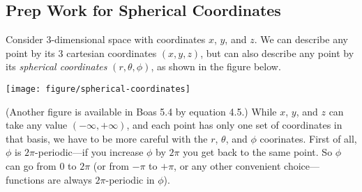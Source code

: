 \documentclass[answers]{exam}\newcommand{\repositoryInformationSetup}{     \usepackage[dvipsnames]{xcolor}     \usepackage[ angle=90, color=black, opacity=1, scale=2, ]{background}      \SetBgPosition{current page.west}      \SetBgVshift{-4.5mm}      \backgroundsetup{contents={{\color{green}\texttt{-{}-} differs from commit \texttt{aac605f} in 0 files}}} } \newcommand{\commit}{{{\color{green}aac605f}}}\usepackage{amsmath}
\newcommand{\Reals}{\mathbb{R}\xspace}
\providecommand{\id}{}
\renewcommand{\id}[1]{\ensuremath{\; \mathrm{d}#1}}
\newcommand{\ket}[1]{\ensuremath{\left|\;#1\;\right\rangle}}
\newcommand{\bracket}[2]{\ensuremath{\left\langle\;#1\;\middle|\;#2\;\right\rangle}}
\let\braket\bracket
\newcommand{\operator}[3]{\ensuremath{\left|\;#1\;\middle\rangle\; #2\; \middle\langle\;#3\;\right|}}
\begin{document}
\begin{questions}
 
	\clearpage
	\section*{Prep Work for Spherical Coordinates}
	\question Consider 3-dimensional space with coordinates $x$, $y$, and $z$.  We can describe any point by its 3 cartesian coordinates $(x, y, z)$, but can also describe any point by its \emph{spherical coordinates} $(r, \theta, \phi)$, as shown in the figure below.
\begin{center}
	\texttt{[image: figure/spherical-coordinates]}
\end{center}
(Another figure is available in Boas 5.4 by equation 4.5.)
While $x$, $y$, and $z$ can take any value $(-\infty,+\infty)$, and each point has only one set of coordinates in that basis, we have to be more careful with the $r$, $\theta$, and $\phi$ coorinates.  First of all, $\phi$ is $2\pi$-periodic---if you increase $\phi$ by $2\pi$ you get back to the same point.  So $\phi$ can go from 0 to $2\pi$ (or from $-\pi$ to $+\pi$, or any other convenient choice---functions are always $2\pi$-periodic in $\phi$).


\end{questions}
\end{document}
